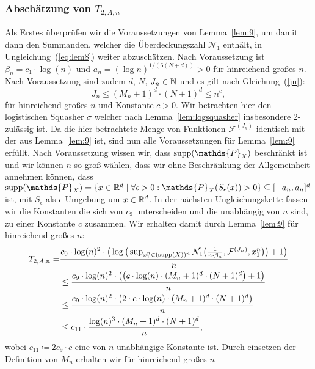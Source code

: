 {\subsubsection{Abschätzung von $T_{2,A,n}$}
Als Erstes überprüfen wir die Voraussetzungen von Lemma~\ref{lem:9}, um damit dann den Summanden, welcher die Überdeckungszahl $\mathcal{N}_1$ enthält, in Ungleichung~(\ref{eq:lem8}) weiter abzuschätzen.
Nach Voraussetzung ist $\beta_n = c_1 \cdot \log(n)$ und $a_n = (\log n)^{1/(6(N + d))} > 0$ für hinreichend großes $n$. Nach Voraussetzung sind zudem $d$, $N$, $J_n \in \mathbb{N}$ und es gilt nach Gleichung~(\ref{jn}): 
$$J_n \leq (M_n + 1)^d \cdot (N + 1)^d \leq n^{c},$$
für hinreichend großes $n$ und Konstante $c > 0$. Wir betrachten hier den logistischen Squasher $\sigma$ welcher nach Lemma~\ref{lem:logsquasher} insbesondere 2-zulässig ist. Da die hier betrachtete Menge von Funktionen $\mathcal{F}^{(J_n)}$ identisch mit der aus Lemma~\ref{lem:9} ist, sind nun alle Voraussetzungen für Lemma~\ref{lem:9} erfüllt. Nach Voraussetzung wissen wir, dass $\supp(\mathds{P}_X)$ beschränkt ist und wir können $n$ so groß wählen, dass wir ohne Beschränkung der Allgemeinheit annehmen können, dass $\supp(\mathds{P}_X) = \{x \in \R^d \mid \forall \epsilon > 0 : \mathds{P}_X(S_{\epsilon}(x)) > 0\} \subseteq [-a_n, a_n]^d$ ist, mit $S_{\epsilon}$ als $\epsilon$-Umgebung um $x \in \mathbb{R}^d$. In der nächsten Ungleichungskette fassen wir die Konstanten die sich von $c_9$ unterscheiden und die unabhängig von $n$ sind, zu einer Konstante $c$ zusammen. Wir erhalten damit durch Lemma~\ref{lem:9} für hinreichend großes $n$:
\begin{equation}
\label{lem9sol}
\begin{split}
T_{2,A,n} = & \frac{c_9 \cdot \log(n)^2 \cdot \big(\log\big(\sup_{x_1^n \in (\operatorname{supp}(X))^n}\mathcal{N}_1\big(\frac{1}{n \cdot \beta_n},\mathcal{F}^{(J_n)},x_1^n\big)\big) + 1\big)}{n} \\
& \leq \frac{c_9 \cdot \log(n)^2 \cdot \big(\big(c \cdot \log(n) \cdot (M_n + 1)^d \cdot (N + 1)^d \big) + 1\big)}{n} \\
& \leq \frac{c_9 \cdot \log(n)^2 \cdot \big(2 \cdot c \cdot \log(n) \cdot (M_n + 1)^d \cdot (N + 1)^d\big)}{n} \\
& \leq c_{11} \cdot \frac{\log(n)^3 \cdot (M_n + 1)^d \cdot (N + 1)^d}{n},
\end{split}
\end{equation}
wobei $c_{11} \coloneqq 2 c_9 \cdot c$ eine von $n$ unabhängige Konstante ist.
Durch einsetzen der Definition von $M_n$ erhalten wir für hinreichend großes $n$ 
}
